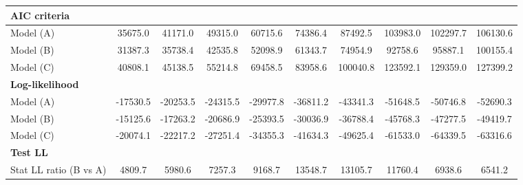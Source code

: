 \documentclass[11pt,twoside, authoryear]{elsarticle}
\begin{document}
\begin{landscape}
\begin{table}[htbp]
{\begin{tabular}{l|c|c|c|c|c|c|c|c|c}
   \multicolumn{10}{l}{ \textbf{AIC criteria}} \\ \hline
    Model (A) & \multicolumn{1}{c}{35675.0} & \multicolumn{1}{c}{41171.0} & \multicolumn{1}{c}{49315.0} & \multicolumn{1}{c}{60715.6} & \multicolumn{1}{c}{74386.4} & \multicolumn{1}{c}{87492.5} & \multicolumn{1}{c}{103983.0} & \multicolumn{1}{c}{102297.7} & \multicolumn{1}{c}{106130.6} \\
    Model (B) & \multicolumn{1}{c}{31387.3} & \multicolumn{1}{c}{35738.4} & \multicolumn{1}{c}{42535.8} & \multicolumn{1}{c}{52098.9} & \multicolumn{1}{c}{61343.7} & \multicolumn{1}{c}{74954.9} & \multicolumn{1}{c}{92758.6} & \multicolumn{1}{c}{95887.1} & \multicolumn{1}{c}{100155.4} \\
    Model (C) & \multicolumn{1}{c}{40808.1} & \multicolumn{1}{c}{45138.5} & \multicolumn{1}{c}{55214.8} & \multicolumn{1}{c}{69458.5} & \multicolumn{1}{c}{83958.6} & \multicolumn{1}{c}{100040.8} & \multicolumn{1}{c}{123592.1} & \multicolumn{1}{c}{129359.0} & \multicolumn{1}{c}{127399.2} \\ \hline
    \multicolumn{10}{l}{\textbf{Log-likelihood}}\\ \hline
    Model (A) & \multicolumn{1}{c}{-17530.5} & \multicolumn{1}{c}{-20253.5} & \multicolumn{1}{c}{-24315.5} & \multicolumn{1}{c}{-29977.8} & \multicolumn{1}{c}{-36811.2} & \multicolumn{1}{c}{-43341.3} & \multicolumn{1}{c}{-51648.5} & \multicolumn{1}{c}{-50746.8} & \multicolumn{1}{c}{-52690.3} \\
    Model (B) & \multicolumn{1}{c}{-15125.6} & \multicolumn{1}{c}{-17263.2} & \multicolumn{1}{c}{-20686.9} & \multicolumn{1}{c}{-25393.5} & \multicolumn{1}{c}{-30036.9} & \multicolumn{1}{c}{-36788.4} & \multicolumn{1}{c}{-45768.3} & \multicolumn{1}{c}{-47277.5} & \multicolumn{1}{c}{-49419.7} \\
    Model (C) & \multicolumn{1}{c}{-20074.1} & \multicolumn{1}{c}{-22217.2} & \multicolumn{1}{c}{-27251.4} & \multicolumn{1}{c}{-34355.3} & \multicolumn{1}{c}{-41634.3} & \multicolumn{1}{c}{-49625.4} & \multicolumn{1}{c}{-61533.0} & \multicolumn{1}{c}{-64339.5} & \multicolumn{1}{c}{-63316.6} \\ \hline
    \multicolumn{10}{l}{\textbf{Test LL} }\\ \hline
    Stat LL ratio (B vs A) & \multicolumn{1}{c}{4809.7} & \multicolumn{1}{c}{5980.6} & \multicolumn{1}{c}{7257.3} & \multicolumn{1}{c}{9168.7} & \multicolumn{1}{c}{13548.7} & \multicolumn{1}{c}{13105.7} & \multicolumn{1}{c}{11760.4} & \multicolumn{1}{c}{6938.6} & \multicolumn{1}{c}{6541.2} \\

\end{tabular}}
\end{table}
\end{landscape}
\end{document}
